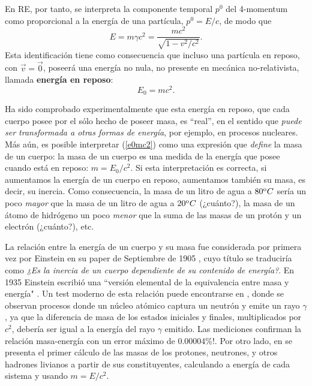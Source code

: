 En RE, por tanto, se interpreta la componente temporal $p^0$ del 4-momentum como proporcional a la energía de una partícula, $p^0=E/c$, de modo que
\begin{equation}
 \boxed{E=m\gamma c^2=\frac{mc^2}{\sqrt{1-v^2/c^2}}.} \label{emgc2}
\end{equation}
 Esta identificación tiene como consecuencia que incluso una  partícula en reposo, con
$\vec{v}=\vec{0}$, poseerá una energía no nula, no presente en mecánica
no-relativista, llamada \textbf{energía en reposo}:
\begin{equation}
\boxed{E_0=mc^2.} \label{e0mc2}
\end{equation}

Ha sido comprobado experimentalmente que esta energía en reposo, que cada
cuerpo posee por el sólo hecho de poseer masa, es ``real'', en el
sentido que \textit{puede ser transformada a otras formas de energía}, por ejemplo, en procesos nucleares. Más aún, es posible interpretar (\ref{e0mc2}) como una expresión que \textit{define} la masa de un cuerpo: la masa de un cuerpo es una medida de la energía que posee cuando está en reposo: $m=E_0/c^2$. Si esta interpretación es correcta, si aumentamos la energía de un cuerpo en reposo, aumentamos también su masa, es decir, su inercia. Como consecuencia, la masa de un litro de agua a $80^{\rm o} C$ sería un poco \textit{mayor} que la masa de un litro de agua a $20^{\rm o} C$ (¿cuánto?), la masa de un átomo de hidrógeno un poco \textit{menor} que la suma de las masas de un protón y un electrón (¿cuánto?), etc.

La relación entre la energía de un cuerpo y su masa fue considerada por primera vez por Einstein en su paper de Septiembre de 1905 \cite{Einstein05}, cuyo título se traduciría como \textit{¿Es la inercia de un cuerpo dependiente de su contenido de energía?}. En 1935 Einstein escribió una ``versión elemental de la equivalencia entre masa y energía" \cite{Einstein35}. Un test moderno de esta relación puede encontrarse en \cite{Rainville05}, donde se observan procesos donde un núcleo atómico captura un neutrón y emite un rayo $\gamma$, ya que la diferencia de masa de los estados iniciales y finales, multiplicados por $c^2$, debería ser igual a la energía del rayo $\gamma$ emitido. Las mediciones confirman la relación masa-energía con un error máximo de 0.00004\%!. Por otro lado, en \cite{Duerr08} se presenta el primer cálculo de las masas de los protones, neutrones, y otros hadrones livianos a partir de sus constituyentes, calculando a energía de cada sistema y usando $m=E/c^2$.

